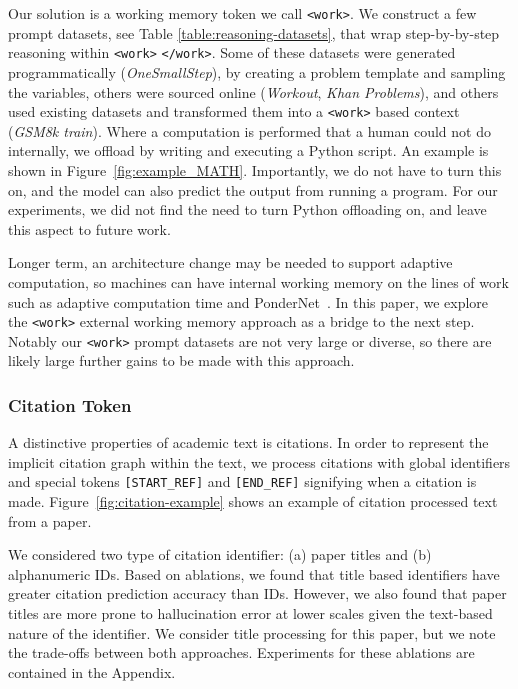 Our solution is a working memory token we call \verb|<work>|. We construct a few prompt datasets, see Table \ref{table:reasoning-datasets}, that wrap step-by-by-step reasoning within \verb|<work>| \verb|</work>|. Some of these datasets were generated programmatically (\textit{OneSmallStep}), by creating a problem template and sampling the variables, others were sourced online (\textit{Workout}, \textit{Khan Problems}), and others used existing datasets and transformed them into a \verb|<work>| based context (\textit{GSM8k train}). Where a computation is performed that a human could not do internally, we offload by writing and executing a Python script. An example is shown in Figure~\ref{fig:example_MATH}. Importantly, we do not have to turn this on, and the model can also predict the output from running a program. For our experiments, we did not find the need to turn Python offloading on, and leave this aspect to future work.

Longer term, an architecture change may be needed to support adaptive computation, so machines can have internal working memory on the lines of work such as adaptive computation time and PonderNet~\citep{ACT, PonderNet}. In this paper, we explore the \verb|<work>| external working memory approach as a bridge to the next step. Notably our \verb|<work>| prompt datasets are not very large or diverse, so there are likely large further gains to be made with this approach.

\subsubsection{Citation Token}

A distinctive properties of academic text is citations. In order to represent the implicit citation graph within the text, we process citations with global identifiers and special tokens \texttt{[START\_REF]} and \texttt{[END\_REF]} signifying when a citation is made. Figure~\ref{fig:citation-example} shows an example of citation processed text from a paper.

We considered two type of citation identifier: (a) paper titles and (b) alphanumeric IDs. Based on ablations, we found that title based identifiers have greater citation prediction accuracy than IDs. However, we also found that paper titles are more prone to hallucination error at lower scales given the text-based nature of the identifier. We consider title processing for this paper, but we note the trade-offs between both approaches. Experiments for these ablations are contained in the Appendix.

